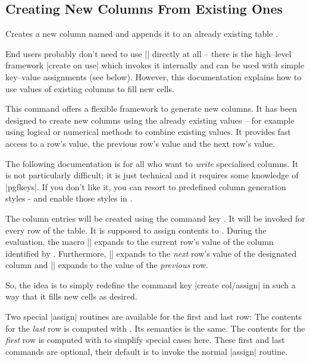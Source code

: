 \subsection{Creating New Columns From Existing Ones}
\begin{command}{\pgfplotstablecreatecol{}}
Creates a new column named  and appends it to an already existing table .

End users probably don't need to use |\pgfplotstablecreatecol| directly at all -- there is the high--level framework |create on use| which invokes it internally and can be used with simple key--value assignments (see below). However, this documentation explains how to use values of existing columns to fill new cells.

This command offers a flexible framework to generate new columns. It has been designed to create new columns using the already existing values -- for example using logical or numerical methods to combine existing values. It provides fast access to a row's value, the previous row's value and the next row's value.

The following documentation is for all who want to \emph{write} specialised columns. It is not particularly difficult; it is just technical and it requires some knowledge of |pgfkeys|. If you don't like it, you can resort to predefined column generation styles - and enable those styles in .

The column entries will be created using the command key . It will be invoked for every row of the table.
It is supposed to assign contents to .
During the evaluation, the macro |\thisrow| 
expands to the current row's value of the column identified by .
Furthermore, |\nextrow| expands to the \emph{next} row's
value of the designated column and |\prevrow| expands to the value of the \emph{previous} row.

So, the idea is to simply redefine the command key |create col/assign| in such a way that it fills new cells as desired.

Two special |assign| routines are available for the first and last row: The contents for the \emph{last} row is computed with . Its semantics is the same. The contents for the \emph{first} row is computed with  to simplify special cases here. These first and last commands are optional, their default is to invoke the normal |assign| routine.


\end{command}
